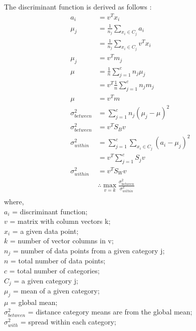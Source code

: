 \documentclass[12pt]{article}
\begin{document}
The discriminant function is derived as follows \parencite{Chen_g_2020}:
\begin{equation}
  \begin{aligned}
    a_{i}                & = v^{T}x_{i}                                                               \\
    \mu_{j}              & = \frac{1}{n_{j}} \sum_{x_{i} \in C_{j}} a_{i}                             \\
                         & =  \frac{1}{n_{j}} \sum_{x_{i} \in C_{j}} v^{T}x_{i}                       \\
    \mu_{j}              & = v^{T} m_{j}                                                              \\
    \mu                  & = \frac{1}{n} \sum^{c}_{j = 1} n_{j} \mu_{j}                               \\
                         & = v^{T} \frac{1}{n} \sum^{c}_{j = 1} n_{j} m_{j}                           \\
    \mu                  & = v^{T} m                                                                  \\
    \sigma^{2}_{between} & = \sum^{c}_{j = 1} n_{j} \left( \mu_{j}-\mu \right)^2                      \\
    \sigma^{2}_{between} & = v^{T} S_{B} v                                                            \\
    \sigma^{2}_{within}  & = \sum^{c}_{j = 1} \sum_{x_{i} \in C_{j}} \left( a_{i} - \mu_{j} \right)^2 \\
                         & = v^{T} \sum^{c}_{j = 1} S_{j} v                                           \\
    \sigma^{2}_{within}  & = v^{T} S_{W} v                                                            \\
                         & \therefore \max_{v = k} \frac{\sigma^{2}_{between}}{\sigma^{2}_{within}}   \\
  \end{aligned}
\end{equation}
where,\\
$a_i$ = discriminant function;\\
$v$ = matrix with column vectors k; \\
$x_i$ = a given data point; \\
$k$ = number of vector columns in v;\\
$n_j$ = number of data points from a given category j;\\
$n$ = total number of data points;\\
$c$ = total number of categories;\\
$C_j$ = a given category j; \\
$\mu_{j}$ = mean of a given category;\\
$\mu$ = global mean; \\
$\sigma^{2}_{between}$ = distance category means are from the global mean; \\
$\sigma^{2}_{with}$ = spread within each category; \\
\end{document}
